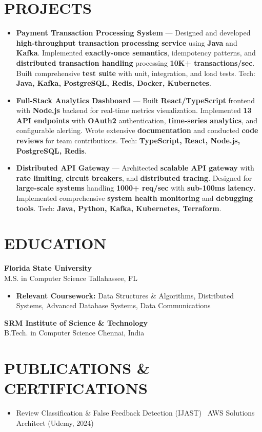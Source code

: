 \documentclass[letterpaper,10pt]{article}
\newcommand{\resumeItem}[1]{\item\small #1}
\newcommand{\resumeSubheading}[4]{
  \vspace{6pt}
  \noindent
  \textbf{#1} \hfill {\footnotesize #2} \\
  [-1pt]
  \noindent
  \small #3 \hfill {\small #4}
  \vspace{3pt}
}
\newcommand{\resumeItemsStart}{\vspace{-2pt}\begin{itemize}}
\newcommand{\resumeItemsEnd}{\end{itemize}\vspace{6pt}}
\begin{document}
\section{\textcolor{metablue}{PROJECTS}}
\vspace{-5pt}
\begin{tcolorbox}[colback=white,colframe=metablue,boxrule=0.8pt,arc=2pt,left=4pt,right=4pt,top=2pt,bottom=2pt]
\begin{itemize}
\resumeItem{\textbf{Payment Transaction Processing System} --- Designed and developed \textbf{high-throughput transaction processing service} using \textbf{Java} and \textbf{Kafka}. Implemented \textbf{exactly-once semantics}, idempotency patterns, and \textbf{distributed transaction handling} processing \textbf{10K+ transactions/sec}. Built comprehensive \textbf{test suite} with unit, integration, and load tests. Tech: \textbf{Java, Kafka, PostgreSQL, Redis, Docker, Kubernetes}.}

\resumeItem{\textbf{Full-Stack Analytics Dashboard} --- Built \textbf{React/TypeScript} frontend with \textbf{Node.js} backend for real-time metrics visualization. Implemented \textbf{13 API endpoints} with \textbf{OAuth2} authentication, \textbf{time-series analytics}, and configurable alerting. Wrote extensive \textbf{documentation} and conducted \textbf{code reviews} for team contributions. Tech: \textbf{TypeScript, React, Node.js, PostgreSQL, Redis}.}

\resumeItem{\textbf{Distributed API Gateway} --- Architected \textbf{scalable API gateway} with \textbf{rate limiting}, \textbf{circuit breakers}, and \textbf{distributed tracing}. Designed for \textbf{large-scale systems} handling \textbf{1000+ req/sec} with \textbf{sub-100ms latency}. Implemented comprehensive \textbf{system health monitoring} and \textbf{debugging tools}. Tech: \textbf{Java, Python, Kafka, Kubernetes, Terraform}.}

\end{itemize}
\end{tcolorbox}
\vspace{-5pt}


\section{\textcolor{metablue}{EDUCATION}}
\vspace{-10pt}
\resumeSubheading
{Florida State University}{}
{M.S. in Computer Science}{Tallahassee, FL}
\resumeItemsStart
\resumeItem{\textbf{Relevant Coursework:} Data Structures \& Algorithms, Distributed Systems, Advanced Database Systems, Data Communications}
\resumeItemsEnd
\vspace{-5pt}
\resumeSubheading
{SRM Institute of Science \& Technology}{}
{B.Tech. in Computer Science}{Chennai, India}
\vspace{-10pt}

\section{\textcolor{metablue}{PUBLICATIONS \& CERTIFICATIONS}}
\vspace{-5pt}
\begin{itemize}
\resumeItem{Review Classification \& False Feedback Detection (IJAST) \textbar\ AWS Solutions Architect (Udemy, 2024)}
\end{itemize}
\end{document}
